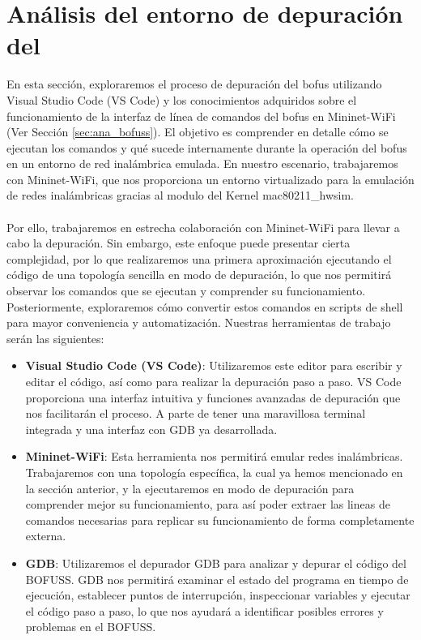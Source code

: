 \section{Análisis del entorno de depuración del }
\label{sec:ana_gdb}

En esta sección, exploraremos el proceso de depuración del \gls{bofus} utilizando Visual Studio Code (VS Code) y los conocimientos adquiridos sobre el funcionamiento de la interfaz de línea de comandos  del \gls{bofus} en Mininet-WiFi (Ver Sección \ref{sec:ana_bofuss}). El objetivo es comprender en detalle cómo se ejecutan los comandos y qué sucede internamente durante la operación del \gls{bofus} en un entorno de red inalámbrica emulada. En nuestro escenario, trabajaremos con Mininet-WiFi, que nos proporciona un entorno virtualizado para la emulación de redes inalámbricas gracias al modulo del Kernel mac80211\_hwsim. \\
\\
Por ello, trabajaremos en estrecha colaboración con Mininet-WiFi para llevar a cabo la depuración. Sin embargo, este enfoque puede presentar cierta complejidad, por lo que realizaremos una primera aproximación ejecutando el código de una topología sencilla en modo de depuración, lo que nos permitirá observar los comandos que se ejecutan y comprender su funcionamiento. Posteriormente, exploraremos cómo convertir estos comandos en scripts de shell para mayor conveniencia y automatización. Nuestras herramientas de trabajo serán las siguientes:\\

\begin{itemize}
    \item \textbf{Visual Studio Code (VS Code)}: Utilizaremos este editor para escribir y editar el código, así como para realizar la depuración paso a paso. VS Code proporciona una interfaz intuitiva y funciones avanzadas de depuración que nos facilitarán el proceso. A parte de tener una maravillosa terminal integrada y una interfaz con GDB ya desarrollada.

    \item \textbf{Mininet-WiFi}: Esta herramienta nos permitirá emular redes inalámbricas. Trabajaremos con una topología específica, la cual ya hemos mencionado en la sección anterior, y la ejecutaremos en modo de depuración para comprender mejor su funcionamiento, para así poder extraer las lineas de comandos necesarias para replicar su funcionamiento de forma completamente externa.

    \item \textbf{GDB}: Utilizaremos el depurador GDB para analizar y depurar el código del BOFUSS. GDB nos permitirá examinar el estado del programa en tiempo de ejecución, establecer puntos de interrupción, inspeccionar variables y ejecutar el código paso a paso, lo que nos ayudará a identificar posibles errores y problemas en el BOFUSS.
\end{itemize}

